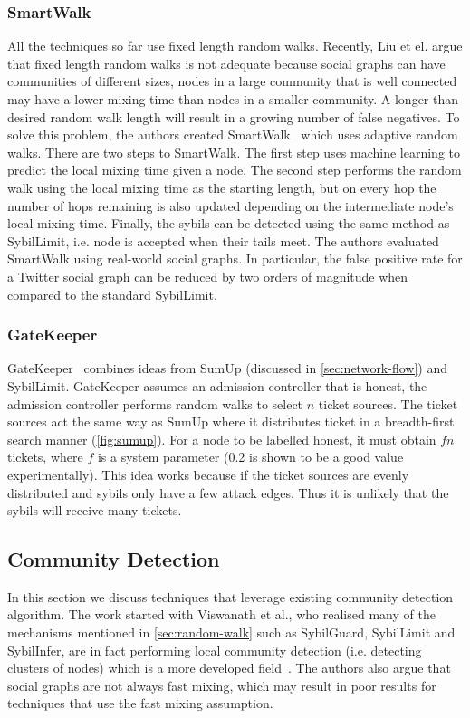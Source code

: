 \subsubsection{SmartWalk}
All the techniques so far use fixed length random walks. Recently, Liu et el.
argue that fixed length random walks is not adequate because social graphs can
have communities of different sizes, nodes in a large community that is well
connected may have a lower mixing time than nodes in a smaller community. A
longer than desired random walk length will result in a growing number of false
negatives. To solve this problem, the authors created
SmartWalk~\cite{liu2016smartwalk} which uses adaptive random walks. There are two
steps to SmartWalk. The first step uses machine learning to predict the local
mixing time given a node. The second step performs the random walk using the
local mixing time as the starting length, but on every hop the number of hops
remaining is also updated depending on the intermediate node's local mixing
time. Finally, the sybils can be detected using the same method as SybilLimit,
i.e. node is accepted when their tails meet. The authors evaluated SmartWalk
using real-world social graphs. In particular, the false positive rate for a
Twitter social graph can be reduced by two orders of magnitude when compared to
the standard SybilLimit.

\subsubsection{GateKeeper}
GateKeeper~\cite{tran2011optimal} combines ideas from SumUp (discussed in
\autoref{sec:network-flow}) and SybilLimit. GateKeeper assumes an admission
controller that is honest, the admission controller performs random walks to
select $n$ ticket sources. The ticket sources act the same way as SumUp where it
distributes ticket in a breadth-first search manner (\autoref{fig:sumup}). For a
node to be labelled honest, it must obtain $fn$ tickets, where $f$ is a system
parameter (0.2 is shown to be a good value experimentally). This idea works
because if the ticket sources are evenly distributed and sybils only have a few
attack edges. Thus it is unlikely that the sybils will receive many tickets.


\subsection{Community Detection}\label{sec:community-detection}
In this section we discuss techniques that leverage existing community detection
algorithm. The work started with Viswanath et al., who realised many of the
mechanisms mentioned in \autoref{sec:random-walk} such as SybilGuard, SybilLimit
and SybilInfer, are in fact performing local community detection (i.e. detecting
clusters of nodes) which is a more developed field~\cite{viswanath2010analysis}.
The authors also argue that social graphs are not always fast mixing, which may
result in poor results for techniques that use the fast mixing assumption.

